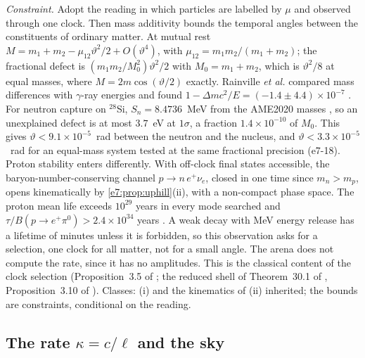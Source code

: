 \emph{Constraint.} Adopt the reading in which particles are labelled by $\mu$ and observed through one clock. Then mass additivity bounds the
temporal angles between the constituents of ordinary matter. At mutual rest $M=m_1+m_2-\mu_{12}\vartheta^2/2+O(\vartheta^4)$, with
$\mu_{12}=m_1m_2/(m_1+m_2)$; the fractional defect is $(m_1m_2/M_0^2)\vartheta^2/2$ with $M_0=m_1+m_2$, which is $\vartheta^2/8$ at equal masses,
where $M=2m\cos(\vartheta/2)$ exactly. Rainville \emph{et al.} compared mass differences with $\gamma$-ray energies and found
$1-\Delta mc^2/E=(-1.4\pm4.4)\times10^{-7}$ \cite{Rainville05}. For neutron capture on $^{28}$Si, $S_n=8.4736$~MeV from the AME2020 masses
\cite{AME2020}, so an unexplained defect is at most $3.7$~eV at $1\sigma$, a fraction $1.4\times10^{-10}$ of $M_0$. This gives
$\vartheta<9.1\times10^{-5}$~rad between the neutron and the nucleus, and $\vartheta<3.3\times10^{-5}$~rad for an equal-mass system tested at the
same fractional precision (e7-18). Proton stability enters differently. With off-clock final states accessible, the baryon-number-conserving
channel $p\to n\,e^+\nu_e$, closed in one time since $m_n>m_p$, opens kinematically by \cref{e7:prop:uphill}(ii), with a non-compact phase space. The
proton mean life exceeds $10^{29}$ years in every mode searched and $\tau/B(p\to e^+\pi^0)>2.4\times10^{34}$ years \cite{PDG,Takenaka20}. A weak
decay with MeV energy release has a lifetime of minutes unless it is forbidden, so this observation asks for a selection, one clock for all matter,
not for a small angle. The arena does not compute the rate, since it has no amplitudes. This is the classical content of the clock selection
(Proposition~3.5 of \cite{ES17}; the reduced shell of Theorem~30.1 of \cite{ES17}, Proposition~3.10 of \cite{TR}). Classes: (i) and the
kinematics of (ii) inherited; the bounds are constraints, conditional on the reading.

\subsection{\texorpdfstring{The rate $\kappa=c/\ell$ and the sky}{The rate kappa = c/l and the sky}}
\label{e7:sec:rate}

